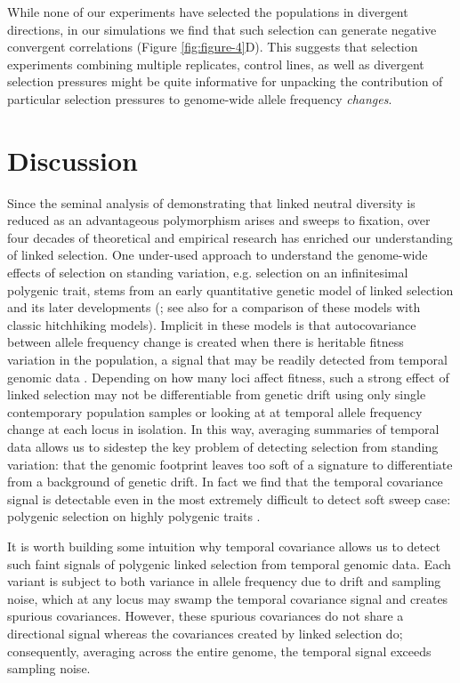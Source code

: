 \documentclass[11pt]{article}
\newcommand{\vb}[1]{{\it \color{blue} #1}}
\begin{document}
While none of our experiments have selected the populations in divergent
directions, in our simulations we find that such selection can generate
negative convergent correlations (Figure \ref{fig:figure-4}D). This suggests
that selection experiments combining multiple replicates, control lines, as
well as divergent selection pressures might be quite informative for unpacking
the contribution of particular selection pressures to genome-wide allele
frequency \vb{changes}.

\section{Discussion}

Since the seminal analysis of \textcite{Maynard_Smith1974-lc} demonstrating
that linked neutral diversity is reduced as an advantageous polymorphism arises
and sweeps to fixation, over four decades of theoretical and empirical research
has enriched our understanding of linked selection.  One under-used approach to
understand the genome-wide effects of selection on standing variation, e.g.
selection on an infinitesimal polygenic trait, stems from an early quantitative
genetic model of linked selection \parencite{Robertson1961-ho} and its later
developments
(\cite{Santiago1995-hx,Santiago1998-bs,Wray1990-zf,Woolliams1993-qo}; see also
\cite{Barton2000-zg} for a comparison of these models with classic hitchhiking
models). Implicit in these models is that autocovariance between allele
frequency change is created when there is heritable fitness variation in the
population, a signal that may be readily detected from temporal genomic data
\parencite{Buffalo2019-io}.  Depending on how many loci affect fitness, such a
strong effect of linked selection may not be differentiable from genetic drift
using only single contemporary population samples or looking at at temporal
allele frequency change at each locus in isolation.  In this way, averaging
summaries of temporal data allows us to sidestep the key problem of detecting
selection from standing variation: that the genomic footprint leaves too soft
of a signature to differentiate from a background of genetic drift. In fact we
find that the temporal covariance signal is detectable even in the most
extremely difficult to detect soft sweep case: polygenic selection on highly
polygenic traits \parencite{Buffalo2019-io}.

It is worth building some intuition why temporal covariance allows us to detect
such faint signals of polygenic linked selection from temporal genomic data.
Each variant is subject to both variance in allele frequency due to drift and
sampling noise, which at any locus may swamp the temporal covariance signal and
creates spurious covariances. However, these spurious covariances do not share
a directional signal whereas the covariances created by linked selection do;
consequently, averaging across the entire genome, the temporal signal exceeds
sampling noise. 
\end{document}
